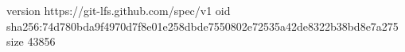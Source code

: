 version https://git-lfs.github.com/spec/v1
oid sha256:74d780bda9f4970d7f8e01e258dbde7550802e72535a42de8322b38bd8e7a275
size 43856
